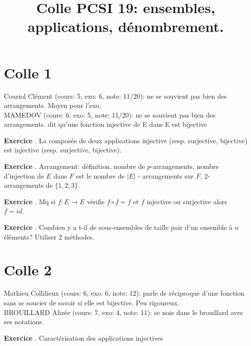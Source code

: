 \documentclass[10pt,a4paper]{article}
\title{Colle PCSI 19: ensembles, applications, dénombrement.}
\newcounter{question}
\newcounter{exo}
\newenvironment{exo}{\vspace{0.5cm}\setcounter{question}{0}\addtocounter{exo}{1} \noindent \textbf{Exercice \theexo}. \normalsize }{\par}
\begin{document}
	\maketitle
	
	
	\section*{Colle 1}
	\setcounter{exo}{0}
	Couriol Clément (cours: 5, exo: 6, note: 11/20): ne se souvient pas bien des arrangements. Moyen pour l'exo.\\
	MAMEDOV (cours: 6, exo: 5, note: 11/20): ne se souvient pas bien des arrangements. dit qu'une fonction injective de E dans E est bijective\\
	
	\begin{exo}
		La composée de deux applications injective (resp. surjective, bijective) est injective (resp. surjective, bijective).
	\end{exo}
	
	\begin{exo}
		Arrangement: définition, nombre de $p$-arrangements, nombre d'injection de $E$ dans $F$ est le nombre de $\vert E \vert$ - arrangements sur $F$, 2-arrangements de $\lbrace 1, 2, 3 \rbrace$.
	\end{exo}

	\begin{exo}
		Mq si $f : E \longrightarrow E$ vérifie $f \circ f = f$ et $f$ injective ou surjective alors $f = id$. 
	\end{exo}

	\begin{exo}
		Combien y a t-il de sous-ensembles de taille pair d'un ensemble à $n$ éléments? Utiliser 2 méthodes.
	\end{exo}
	
	\section*{Colle 2}
	\setcounter{exo}{0}
	Mathieu Collilieux (cours: 6, exo: 6, note: 12): parle de réciproque d'une fonction sans se soucier de savoir si elle est bijective. Peu rigoureux.\\
	BROUILLARD Alizée (cours: 7, exo: 4, note: 11): se noie dans le brouillard avec ses notations.\\
	
	\begin{exo}
		Caractérisation des applications injectives
	\end{exo}
	
\end{document}
